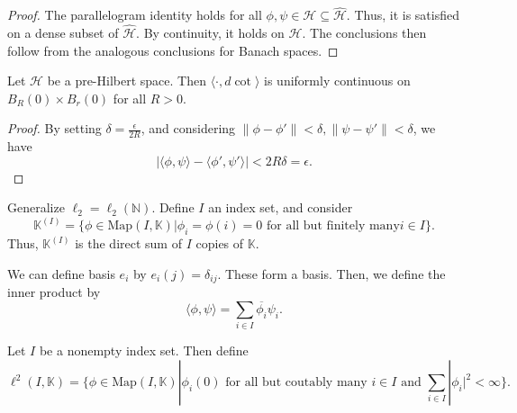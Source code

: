\documentclass[prb,12pt]{revtex4-2}
\theoremstyle{definition}
\theoremstyle{definition}
\theoremstyle{definition}
\newcommand{\N}{\mathbb{N}}
\begin{document}
\begin{proof}
	The parallelogram identity holds for all $\phi,\psi\in \mathcal{H}\subseteq \hat{\mathcal{H}}$. Thus, it is satisfied on a dense subset of $\hat{\mathcal{H}}$. By continuity, it holds on $\hat{\mathcal{H}}$.
The conclusions then follow from the analogous conclusions for Banach spaces.
\end{proof}
\begin{Theorem}
	Let $\mathcal{H}$ be a pre-Hilbert space. Then $\langle\cdot, d\cot\rangle$ is uniformly continuous on $B_R(0)\times B_r(0)$ for all $R>0$.
\end{Theorem}
\begin{proof}
	By setting $\delta=\frac{\epsilon}{2R}$, and considering $\|\phi-\phi'\|<\delta, \|\psi- \psi'\|<\delta$, we have
	\[
	|\langle \phi, \psi\rangle - \langle \phi', \psi'\rangle| < 2R\delta = \epsilon
	.\] 
\end{proof}
\begin{Example}
	Generalize $\ell_2=\ell_2(\N)$. Define $I$ an index set, and consider
	\[
		\mathbb{K}^{(I)}=\{\phi\in\text{Map}(I, \mathbb{K})|\phi_i=\phi(i)=0\text{ for all but finitely many}i\in I\} 
	.\] 
	Thus, $\mathbb{K}^{(I)}$ is the direct sum of $I$ copies of $\mathbb{K}$.

	We can define basis $e_i$ by $e_i(j)=\delta_{ij}$. These form a basis. Then, we define the inner product by
	\[
		\langle \phi, \psi\rangle = \sum_{i\in I}\overline{\phi_i}\psi_i
	.\] 
\end{Example}
\begin{Example}[$\ell^2(I)$ ]
	Let $I$ be a nonempty index set. Then define
	\[
		\ell^2(I, \mathbb{K}) = \{\phi\in \text{Map}(I, \mathbb{K})|\phi_i(0)\text{ for all but coutably many }i\in I\text{ and }\sum_{i\in I}|\phi_i|^2<\infty\} 
	.\] 
\end{Example}
	
\end{document}
